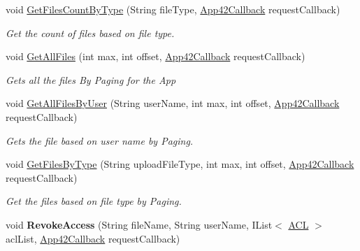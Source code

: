 \begin{DoxyCompactItemize}
void \hyperlink{classcom_1_1shephertz_1_1app42_1_1paas_1_1sdk_1_1windows_1_1upload_1_1_upload_service_a90c85a16de17f45e57286b4652cd8eb2}{Get\+Files\+Count\+By\+Type} (String file\+Type, \hyperlink{interfacecom_1_1shephertz_1_1app42_1_1paas_1_1sdk_1_1windows_1_1_app42_callback}{App42\+Callback} request\+Callback)
\begin{DoxyCompactList}\small\item\em Get the count of files based on file type. \end{DoxyCompactList}\item 
void \hyperlink{classcom_1_1shephertz_1_1app42_1_1paas_1_1sdk_1_1windows_1_1upload_1_1_upload_service_ac036c74e4c7b87f276b925bb1290de35}{Get\+All\+Files} (int max, int offset, \hyperlink{interfacecom_1_1shephertz_1_1app42_1_1paas_1_1sdk_1_1windows_1_1_app42_callback}{App42\+Callback} request\+Callback)
\begin{DoxyCompactList}\small\item\em Gets all the files By Paging for the App \end{DoxyCompactList}\item 
void \hyperlink{classcom_1_1shephertz_1_1app42_1_1paas_1_1sdk_1_1windows_1_1upload_1_1_upload_service_a20adf25813e0f5d5faa1d0b2ddfdfe28}{Get\+All\+Files\+By\+User} (String user\+Name, int max, int offset, \hyperlink{interfacecom_1_1shephertz_1_1app42_1_1paas_1_1sdk_1_1windows_1_1_app42_callback}{App42\+Callback} request\+Callback)
\begin{DoxyCompactList}\small\item\em Gets the file based on user name by Paging. \end{DoxyCompactList}\item 
void \hyperlink{classcom_1_1shephertz_1_1app42_1_1paas_1_1sdk_1_1windows_1_1upload_1_1_upload_service_a5a9d3ed51378a7b54a66ca10413e74e5}{Get\+Files\+By\+Type} (String upload\+File\+Type, int max, int offset, \hyperlink{interfacecom_1_1shephertz_1_1app42_1_1paas_1_1sdk_1_1windows_1_1_app42_callback}{App42\+Callback} request\+Callback)
\begin{DoxyCompactList}\small\item\em Get the files based on file type by Paging. \end{DoxyCompactList}\item 
\hypertarget{classcom_1_1shephertz_1_1app42_1_1paas_1_1sdk_1_1windows_1_1upload_1_1_upload_service_a4d7582878cdfd4d9367b08c16ee59784}{void {\bfseries Revoke\+Access} (String file\+Name, String user\+Name, I\+List$<$ \hyperlink{classcom_1_1shephertz_1_1app42_1_1paas_1_1sdk_1_1windows_1_1_a_c_l}{A\+C\+L} $>$ acl\+List, \hyperlink{interfacecom_1_1shephertz_1_1app42_1_1paas_1_1sdk_1_1windows_1_1_app42_callback}{App42\+Callback} request\+Callback)}\label{classcom_1_1shephertz_1_1app42_1_1paas_1_1sdk_1_1windows_1_1upload_1_1_upload_service_a4d7582878cdfd4d9367b08c16ee59784}


\end{DoxyCompactItemize}
